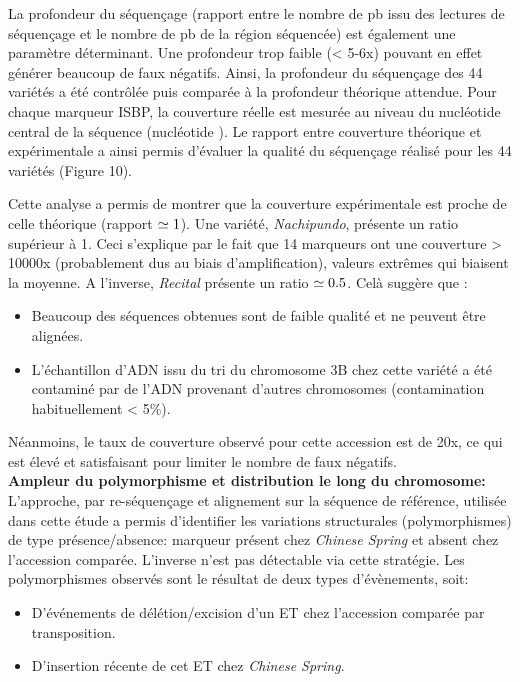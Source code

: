 \documentclass[a4paper, 12pt]{article}
\begin{document}
\begin{onehalfspace}
La profondeur du séquençage (rapport entre le nombre de pb issu des lectures de séquençage et le nombre de pb de la région séquencée) est également une paramètre déterminant. Une profondeur trop faible (< 5-6x) pouvant en effet générer beaucoup de faux négatifs. Ainsi, la profondeur du séquençage des 44 variétés a été contrôlée puis comparée à la profondeur théorique attendue. Pour chaque marqueur ISBP, la couverture réelle est mesurée au niveau du nucléotide central de la séquence (nucléotide ). Le rapport entre couverture théorique et expérimentale a ainsi permis d'évaluer la qualité du séquençage réalisé pour les 44 variétés (Figure 10).

Cette analyse a permis de montrer que la couverture expérimentale est proche de celle théorique (rapport $\begin{simeq}1\end{simeq}$). Une variété, \textit{Nachipundo}, présente un ratio supérieur à 1. Ceci s'explique par le fait que 14 marqueurs ont une couverture > 10000x (probablement dus au biais d'amplification), valeurs extrêmes qui biaisent la moyenne. A l'inverse, \textit{Recital} présente un ratio $\begin{simeq}0.5\end{simeq}$. Celà suggère que : 
\begin{itemize}
\item Beaucoup des séquences obtenues sont de faible qualité et ne peuvent être alignées.
\item L'échantillon d'ADN issu du tri du chromosome 3B chez cette variété a été contaminé par de l'ADN provenant d'autres chromosomes (contamination habituellement < 5\%).
\end{itemize}
Néanmoins, le taux de couverture observé pour cette accession est de 20x, ce qui est élevé et satisfaisant pour limiter le nombre de faux négatifs.\\

\textbf{Ampleur du polymorphisme et distribution le long du chromosome:} L'approche, par re-séquençage et alignement sur la séquence de référence, utilisée dans cette étude a permis d'identifier les variations structurales (polymorphismes) de type présence/absence: marqueur présent chez \textit{Chinese Spring} et absent chez l'accession comparée. L'inverse n'est pas détectable via cette stratégie. Les polymorphismes observés sont le résultat de deux types d'évènements, soit:
\begin{itemize}
\item D'événements de délétion/excision d'un ET chez l'accession comparée par transposition.
\item D'insertion récente de cet ET chez \textit{Chinese Spring}.
\end{itemize}


\end{onehalfspace}
\end{document}
